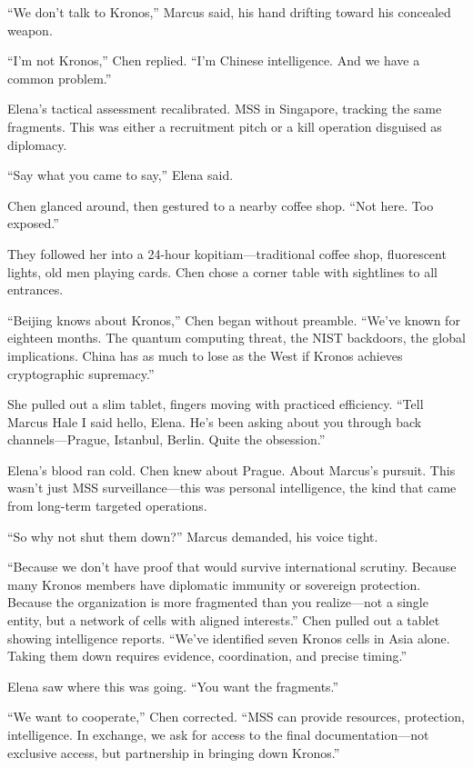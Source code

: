 ``We don't talk to Kronos,'' Marcus said, his hand drifting toward his concealed weapon.

``I'm not Kronos,'' Chen replied. ``I'm Chinese intelligence. And we have a common problem.''

Elena's tactical assessment recalibrated. MSS in Singapore, tracking the same fragments. This was either a recruitment pitch or a kill operation disguised as diplomacy.

``Say what you came to say,'' Elena said.

Chen glanced around, then gestured to a nearby coffee shop. ``Not here. Too exposed.''

They followed her into a 24-hour kopitiam---traditional coffee shop, fluorescent lights, old men playing cards. Chen chose a corner table with sightlines to all entrances.

``Beijing knows about Kronos,'' Chen began without preamble. ``We've known for eighteen months. The quantum computing threat, the NIST backdoors, the global implications. China has as much to lose as the West if Kronos achieves cryptographic supremacy.''

She pulled out a slim tablet, fingers moving with practiced efficiency. ``Tell Marcus Hale I said hello, Elena. He's been asking about you through back channels---Prague, Istanbul, Berlin. Quite the obsession.''

Elena's blood ran cold. Chen knew about Prague. About Marcus's pursuit. This wasn't just MSS surveillance---this was personal intelligence, the kind that came from long-term targeted operations.

``So why not shut them down?'' Marcus demanded, his voice tight.

``Because we don't have proof that would survive international scrutiny. Because many Kronos members have diplomatic immunity or sovereign protection. Because the organization is more fragmented than you realize---not a single entity, but a network of cells with aligned interests.'' Chen pulled out a tablet showing intelligence reports. ``We've identified seven Kronos cells in Asia alone. Taking them down requires evidence, coordination, and precise timing.''

Elena saw where this was going. ``You want the fragments.''

``We want to cooperate,'' Chen corrected. ``MSS can provide resources, protection, intelligence. In exchange, we ask for access to the final documentation---not exclusive access, but partnership in bringing down Kronos.''

